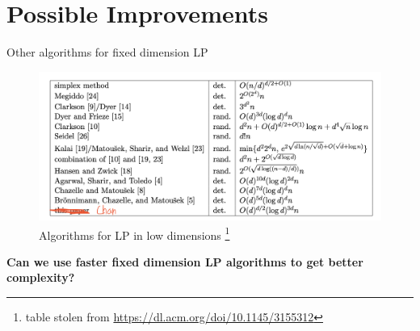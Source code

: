 \documentclass{beamer}
\begin{document}
\section{Possible Improvements}

\begin{frame}{Other algorithms for fixed dimension LP}
    \begin{figure}
        \centering
        \includegraphics[width=\textwidth]{images/table.png}
        \caption{Algorithms for LP in low dimensions \footnote{table stolen from \url{https://dl.acm.org/doi/10.1145/3155312}}}
    \end{figure}
    \textbf{Can we use faster fixed dimension LP algorithms to get better complexity?}
\end{frame}
\end{document}

